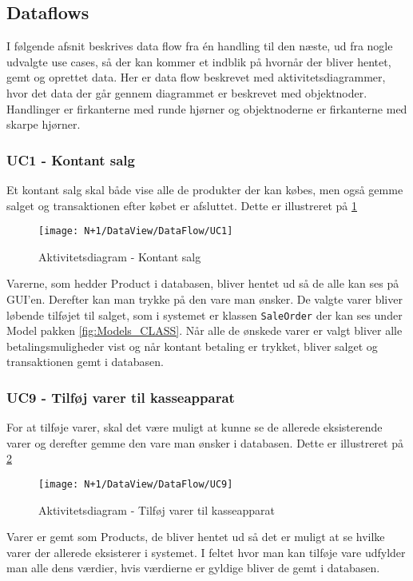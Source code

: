 \subsection{Dataflows}
I følgende afsnit beskrives data flow fra én handling til den næste, ud fra nogle udvalgte use cases, så der kan kommer et indblik på hvornår der bliver hentet, gemt og oprettet data. Her er data flow beskrevet med aktivitetsdiagrammer, hvor det data der går gennem diagrammet er beskrevet med objektnoder. Handlinger er firkanterne med runde hjørner og objektnoderne er firkanterne med skarpe hjørner.   

\subsubsection{UC1 - Kontant salg}
Et kontant salg skal både vise alle de produkter der kan købes, men også gemme salget og transaktionen efter købet er afsluttet. Dette er illustreret på \ref{fig:AD_UC1}

\begin{figure}[H]
    \centering
    \texttt{[image: N+1/DataView/DataFlow/UC1]}
    \caption{Aktivitetsdiagram - Kontant salg}
    \label{fig:AD_UC1}
\end{figure}    

Varerne, som hedder Product i databasen, bliver hentet ud så de alle kan ses på GUI'en. Derefter kan man trykke på den vare man ønsker. De valgte varer bliver løbende tilføjet til salget, som i systemet er klassen \texttt{SaleOrder} der kan ses under Model pakken \ref{fig:Models_CLASS}. Når alle de ønskede varer er valgt bliver alle betalingsmuligheder vist og når kontant betaling er trykket, bliver salget og transaktionen gemt i databasen. 

\subsubsection{UC9 - Tilføj varer til kasseapparat}
For at tilføje varer, skal det være muligt at kunne se de allerede eksisterende varer og derefter gemme den vare man ønsker i databasen. Dette er illustreret på \ref{fig:AD_UC9}

\begin{figure}[H]
    \centering
    \texttt{[image: N+1/DataView/DataFlow/UC9]}
    \caption{Aktivitetsdiagram - Tilføj varer til kasseapparat}
    \label{fig:AD_UC9}
\end{figure}    

Varer er gemt som Products, de bliver hentet ud så det er muligt at se hvilke varer der allerede eksisterer i systemet. I feltet hvor man kan tilføje vare udfylder man alle dens værdier, hvis værdierne er gyldige bliver de gemt i databasen. 

